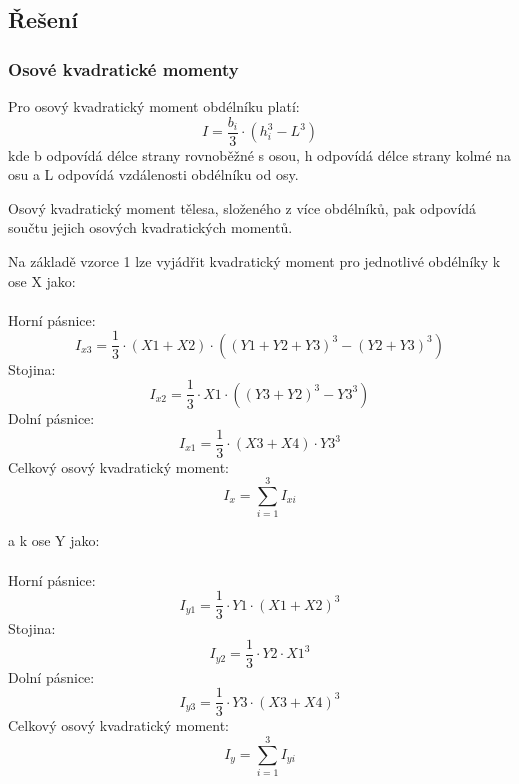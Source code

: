  \newpage

\subsection{Řešení}

\subsubsection{Osové kvadratické momenty}
Pro osový kvadratický moment obdélníku platí: 
\begin{equation}
    I =  \frac{b_i}{3}  \cdot (h_i^3-L^3)  
\end{equation}
kde b odpovídá délce strany rovnoběžné s osou, h odpovídá délce strany kolmé na osu a L odpovídá vzdálenosti obdélníku od osy. 

Osový kvadratický moment tělesa, složeného z více obdélníků, pak odpovídá součtu jejich osových kvadratických momentů.

Na základě vzorce 1 lze vyjádřit kvadratický moment pro jednotlivé obdélníky k ose X jako:
\\ 
 \\ 
Horní pásnice:
\begin{equation}
    I_{x3} =  \frac{1}{3}  \cdot(X1 + X2) \cdot ((Y1 + Y2 + Y3)^3 - (Y2 + Y3)^3)
\end{equation}
Stojina:
\begin{equation}
    I_{x2} =  \frac{1}{3}  \cdot X1 \cdot ((Y3 + Y2)^3 - Y3^3) 
\end{equation}
Dolní pásnice:
\begin{equation}
    I_{x1} =  \frac{1}{3}  \cdot (X3 + X4) \cdot Y3^3 
\end{equation}
Celkový osový kvadratický moment:
\begin{equation}
    I_x =  \sum_{i=1}^{3}  I_{xi}
\end{equation}
 
a k ose Y jako:
\\ 
 \\ 
\noindent Horní pásnice:
\begin{equation}
    I_{y1} =  \frac{1}{3}  \cdot Y1 \cdot  (X1 + X2)^3  
\end{equation}
Stojina:
\begin{equation}
    I_{y2} =  \frac{1}{3}  \cdot Y2 \cdot X1^3
\end{equation}
Dolní pásnice:
\begin{equation}
    I_{y3} =  \frac{1}{3}  \cdot Y3 \cdot (X3 + X4)^3
\end{equation}
Celkový osový kvadratický moment:
\begin{equation}
    I_y =  \sum_{i=1}^{3} I_{yi}
\end{equation}

